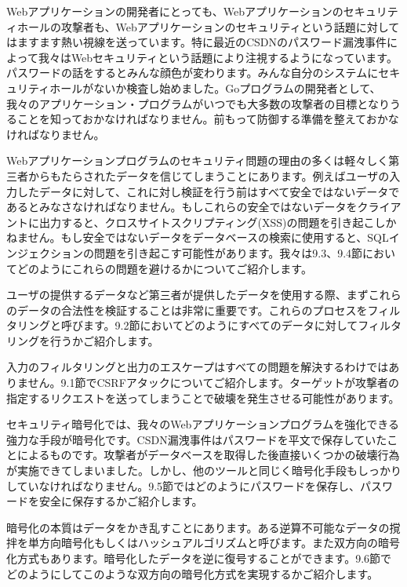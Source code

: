 Webアプリケーションの開発者にとっても、Webアプリケーションのセキュリティホールの攻撃者も、Webアプリケーションのセキュリティという話題に対してはますます熱い視線を送っています。特に最近のCSDNのパスワード漏洩事件によって我々はWebセキュリティという話題により注視するようになっています。パスワードの話をするとみんな顔色が変わります。みんな自分のシステムにセキュリティホールがないか検査し始めました。Goプログラムの開発者として、我々のアプリケーション・プログラムがいつでも大多数の攻撃者の目標となりうることを知っておかなければなりません。前もって防御する準備を整えておかなければなりません。

Webアプリケーションプログラムのセキュリティ問題の理由の多くは軽々しく第三者からもたらされたデータを信じてしまうことにあります。例えばユーザの入力したデータに対して、これに対し検証を行う前はすべて安全ではないデータであるとみなさなければなりません。もしこれらの安全ではないデータをクライアントに出力すると、クロスサイトスクリプティング(XSS)の問題を引き起こしかねません。もし安全ではないデータをデータベースの検索に使用すると、SQLインジェクションの問題を引き起こす可能性があります。我々は9.3、9.4節においてどのようにこれらの問題を避けるかについてご紹介します。

ユーザの提供するデータなど第三者が提供したデータを使用する際、まずこれらのデータの合法性を検証することは非常に重要です。これらのプロセスをフィルタリングと呼びます。9.2節においてどのようにすべてのデータに対してフィルタリングを行うかご紹介します。

入力のフィルタリングと出力のエスケープはすべての問題を解決するわけではありません。9.1節でCSRFアタックについてご紹介します。ターゲットが攻撃者の指定するリクエストを送ってしまうことで破壊を発生させる可能性があります。

セキュリティ暗号化では、我々のWebアプリケーションプログラムを強化できる強力な手段が暗号化です。CSDN漏洩事件はパスワードを平文で保存していたことによるものです。攻撃者がデータベースを取得した後直接いくつかの破壊行為が実施できてしまいました。しかし、他のツールと同じく暗号化手段もしっかりしていなければなりません。9.5節ではどのようにパスワードを保存し、パスワードを安全に保存するかご紹介します。

暗号化の本質はデータをかき乱すことにあります。ある逆算不可能なデータの撹拌を単方向暗号化もしくはハッシュアルゴリズムと呼びます。また双方向の暗号化方式もあります。暗号化したデータを逆に復号することができます。9.6節でどのようにしてこのような双方向の暗号化方式を実現するかご紹介します。
